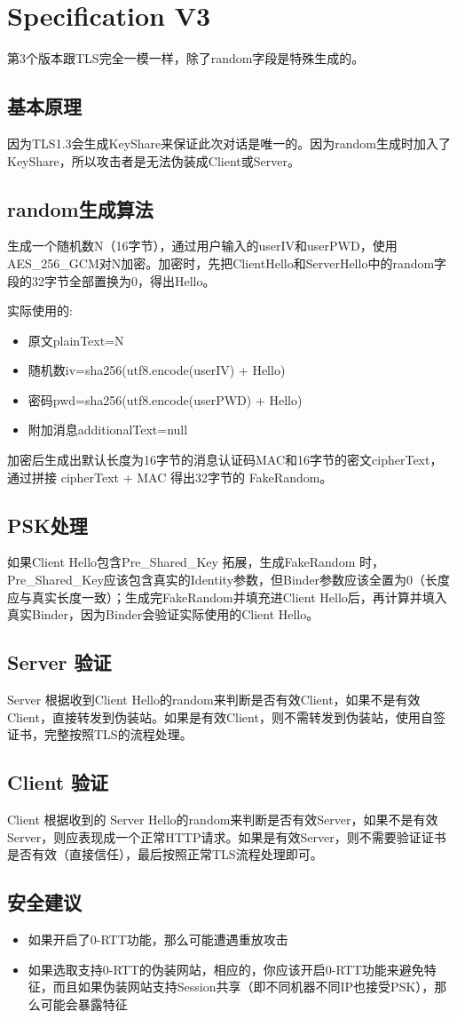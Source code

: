 \chapter{Specification V3}
第3个版本跟TLS完全一模一样，除了random字段是特殊生成的。

\section{基本原理}
因为TLS1.3会生成KeyShare来保证此次对话是唯一的。因为random生成时加入了KeyShare，所以攻击者是无法伪装成Client或Server。

\section{random生成算法}
生成一个随机数N（16字节），通过用户输入的userIV和userPWD，使用AES\_256\_GCM对N加密。加密时，先把ClientHello和ServerHello中的random字段的32字节全部置换为0，得出Hello。

实际使用的:
\begin{itemize}
	\item 原文plainText=N
	\item 随机数iv=sha256(utf8.encode(userIV) + Hello)
	\item 密码pwd=sha256(utf8.encode(userPWD) + Hello)
	\item 附加消息additionalText=null
\end{itemize}

加密后生成出默认长度为16字节的消息认证码MAC和16字节的密文cipherText，通过拼接 cipherText + MAC 得出32字节的 FakeRandom。

\section{PSK处理}
如果Client Hello包含Pre\_Shared\_Key 拓展，生成FakeRandom 时，Pre\_Shared\_Key应该包含真实的Identity参数，但Binder参数应该全置为0（长度应与真实长度一致）；生成完FakeRandom并填充进Client Hello后，再计算并填入真实Binder，因为Binder会验证实际使用的Client Hello。

\section{Server 验证}
Server 根据收到Client Hello的random来判断是否有效Client，如果不是有效Client，直接转发到伪装站。如果是有效Client，则不需转发到伪装站，使用自签证书，完整按照TLS的流程处理。

\section{Client 验证}
Client 根据收到的 Server Hello的random来判断是否有效Server，如果不是有效Server，则应表现成一个正常HTTP请求。如果是有效Server，则不需要验证证书是否有效（直接信任），最后按照正常TLS流程处理即可。

\section{安全建议}
\begin{itemize}
	\item 如果开启了0-RTT功能，那么可能遭遇重放攻击
	\item 如果选取支持0-RTT的伪装网站，相应的，你应该开启0-RTT功能来避免特征，而且如果伪装网站支持Session共享（即不同机器不同IP也接受PSK），那么可能会暴露特征
\end{itemize}

